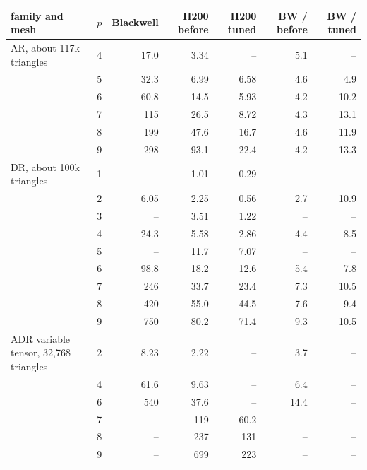 \begin{tabular}{lrrrrrr}
\toprule
family and mesh & $p$ & Blackwell & H200 before & H200 tuned & BW / before & BW / tuned\\
\midrule
AR, about 117k triangles & 4 & 17.0 & 3.34 & -- & 5.1 & --\\
 & 5 & 32.3 & 6.99 & 6.58 & 4.6 & 4.9\\
 & 6 & 60.8 & 14.5 & 5.93 & 4.2 & 10.2\\
 & 7 & 115 & 26.5 & 8.72 & 4.3 & 13.1\\
 & 8 & 199 & 47.6 & 16.7 & 4.6 & 11.9\\
 & 9 & 298 & 93.1 & 22.4 & 4.2 & 13.3\\
\addlinespace[2pt]
DR, about 100k triangles & 1 & -- & 1.01 & 0.29 & -- & --\\
 & 2 & 6.05 & 2.25 & 0.56 & 2.7 & 10.9\\
 & 3 & -- & 3.51 & 1.22 & -- & --\\
 & 4 & 24.3 & 5.58 & 2.86 & 4.4 & 8.5\\
 & 5 & -- & 11.7 & 7.07 & -- & --\\
 & 6 & 98.8 & 18.2 & 12.6 & 5.4 & 7.8\\
 & 7 & 246 & 33.7 & 23.4 & 7.3 & 10.5\\
 & 8 & 420 & 55.0 & 44.5 & 7.6 & 9.4\\
 & 9 & 750 & 80.2 & 71.4 & 9.3 & 10.5\\
\addlinespace[2pt]
ADR variable tensor, 32,768 triangles & 2 & 8.23 & 2.22 & -- & 3.7 & --\\
 & 4 & 61.6 & 9.63 & -- & 6.4 & --\\
 & 6 & 540 & 37.6 & -- & 14.4 & --\\
 & 7 & -- & 119 & 60.2 & -- & --\\
 & 8 & -- & 237 & 131 & -- & --\\
 & 9 & -- & 699 & 223 & -- & --\\
\bottomrule
\end{tabular}

